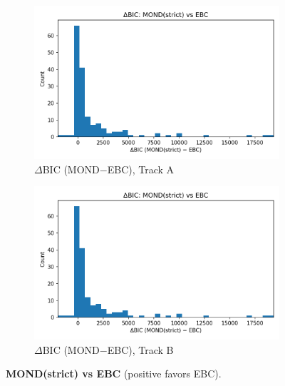 \documentclass[12pt]{article}
\begin{document}
\begin{figure}[H]
  \centering
  \begin{subfigure}{0.48\linewidth}
    \centering\includegraphics[width=\linewidth]{figs_trackA_dense/dBIC_M3_minus_M0.png}
    \caption{$\Delta$BIC (MOND$-$EBC), Track A}
  \end{subfigure}\hfill
  \begin{subfigure}{0.48\linewidth}
    \centering\includegraphics[width=\linewidth]{figs_trackB_dense/dBIC_M3_minus_M0.png}
    \caption{$\Delta$BIC (MOND$-$EBC), Track B}
  \end{subfigure}
  \caption{\textbf{MOND(strict) vs EBC} (positive favors EBC).}
  \label{fig:dbicM3M0}
\end{figure}
\end{document}
